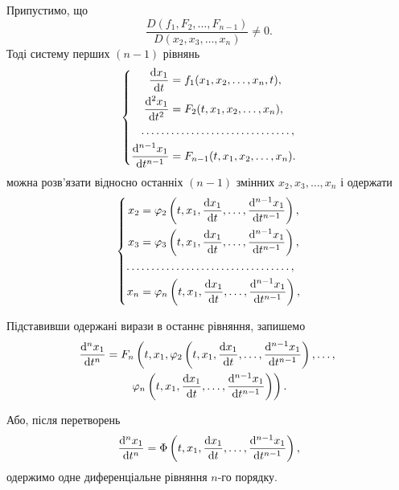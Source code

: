 Припустимо, що \[\frac{D(f_1, F_2, \ldots, F_{n - 1})}{D(x_2, x_3, \ldots, x_n)} \ne 0.\] Тоді систему перших $(n - 1)$ рівнянь 
\begin{equation*}
	\left\{
		\begin{aligned}
			\frac{\mathop{}\!\mathrm{d} x_1}{\mathop{}\!\mathrm{d} t} &= f_1 (x_1, x_2, \ldots, x_n, t), \\
			\frac{\mathop{}\!\mathrm{d}^2 x_1}{\mathop{}\!\mathrm{d} t^2} &= F_2(t, x_1, x_2, \ldots, x_n), \\
			\ldots \ldots & \ldots \ldots \ldots \ldots \ldots \ldots \ldots \ldots, \\
			\frac{\mathop{}\!\mathrm{d}^{n - 1} x_1}{\mathop{}\!\mathrm{d} t^{n - 1}} &= F_{n - 1}(t, x_1, x_2, \ldots, x_n).
		\end{aligned}
	\right.
\end{equation*}
можна розв'язати відносно останніх $(n - 1)$ змінних $x_2, x_3, \ldots, x_n$ і одержати
\begin{equation*}
	\left\{
		\begin{aligned}
			x_2 &= \phi_2 \left( t, x_1, \frac{\diff x_1}{\diff t}, \ldots, \frac{\diff^{n - 1} x_1}{\diff t^{n - 1}} \right), \\
			x_3 &= \phi_3 \left( t, x_1, \frac{\diff x_1}{\diff t}, \ldots, \frac{\diff^{n - 1} x_1}{\diff t^{n - 1}} \right), \\
			\ldots & \ldots \ldots \ldots \ldots \ldots \ldots \ldots \ldots \ldots \ldots, \\
			x_n &= \phi_n \left( t, x_1, \frac{\diff x_1}{\diff t}, \ldots, \frac{\diff^{n - 1} x_1}{\diff t^{n - 1}} \right), \\
		\end{aligned}
	\right.
\end{equation*}

Підставивши одержані вирази в останнє рівняння, запишемо
\begin{multline*}
	\frac{\diff^n x_1}{\diff t^n} = F_n \left( t, x_1, \phi_2 \left( t, x_1, \frac{\diff x_1}{\diff t}, \ldots, \frac{\diff^{n - 1} x_1}{\diff t^{n - 1}} \right), \ldots, \right. \\ \left. \phi_n \left( t, x_1, \frac{\diff x_1}{\diff t}, \ldots, \frac{\diff^{n - 1} x_1}{\diff t^{n - 1}} \right) \right).	
\end{multline*}

Або, після перетворень
\begin{equation*}
	\frac{\mathop{}\!\mathrm{d}^n x_1}{\mathop{}\!\mathrm{d} t^n} = \Phi \left( t, x_1, \frac{\mathop{}\!\mathrm{d} x_1}{\mathop{}\!\mathrm{d} t}, \ldots, \frac{\mathop{}\!\mathrm{d}^{n - 1} x_1}{\mathop{}\!\mathrm{d} t^{n - 1}} \right),
\end{equation*}
одержимо одне диференціальне рівняння $n$-го порядку. \\

